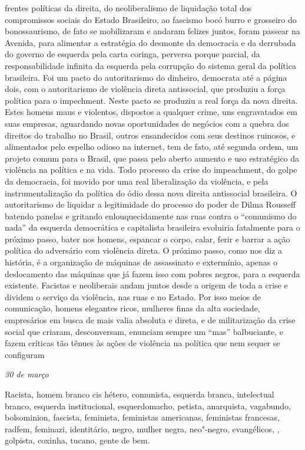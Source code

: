 frentes políticas da direita, do neoliberalismo de liquidação total dos
compromissos sociais do Estado Brasileiro, ao fascismo bocó burro e
grosseiro do bonossaurismo, de fato se mobilizaram e andaram felizes
juntos, foram passear na Avenida, para alimentar a estratégia do
desmonte da democracia e da derrubada do governo de esquerda pela carta
coringa, perversa porque parcial, da responsabilidade infinita da
esquerda pela corrupção do sistema geral da política brasileira. Foi um
pacto do autoritarismo do dinheiro, democrata até a página dois, com o
autoritarismo de violência direta antissocial, que produziu a força
política para o impechment. Neste pacto se produziu a real força da nova
direita. Estes homens maus e violentos, dispostos a qualquer crime, uns
engravatados em suas empresas, aguardando novas oportunidades de
negócios com a quebra dos direitos do trabalho no Brasil, outros
ensandecidos com seus destinos ruinosos, e alimentados pelo espelho
odioso na internet, tem de fato, até segunda ordem, um projeto comum
para o Brasil, que passa pelo aberto aumento e uso estratégico da
violência na política e na vida. Todo processo da crise do impeachment,
do golpe da democracia, foi movido por uma real liberalização da
violência, e pela instrumentalização da política do ódio dessa nova
direita antissocial brasileira. O autoritarismo de liquidar a
legitimidade do processo do poder de Dilma Rousseff batendo panelas e
gritando enlouquecidamente nas ruas contra o ``comunismo do nada'' da
esquerda democrática e capitalista brasileira evoluiria fatalmente para
o próximo passo, bater nos homens, espancar o corpo, calar, ferir e
barrar a ação política do adversário com violência direta. O próximo
passo, como nos diz a história, é a organização de máquinas de
assassinato e extermínio, apenas o deslocamento das máquinas que já
fazem isso com pobres negros, para a esquerda existente. Facistas e
neoliberais andam juntos desde a origem de toda a crise e dividem o
serviço da violência, nas ruas e no Estado. Por isso meios de
comunicação, homens elegantes ricos, mulheres finas da alta sociedade,
empresários em busca de mais valia absoluta e direta, e de militarização
da crise social que criaram, desconversam, enunciam sempre um ``mas''
balbuciante, e fazem críticas tão tênues às ações de violência na
política que nem sequer se configuram

\begin{flushright}
\emph{30 de março}
\end{flushright}

Racista, homem branco cis hétero, comunista, esquerda branca,
intelectual branco, esquerda institucional, esquerdomacho, petista,
anarquista, vagabundo, bolsominion, fascista, feminista, feministas
americanas, feministas francesas, radfem, feminazi, identitário, negro,
mulher negra, neo"-negro, evangélicos, , golpista, coxinha, tucano,
gente de bem.

